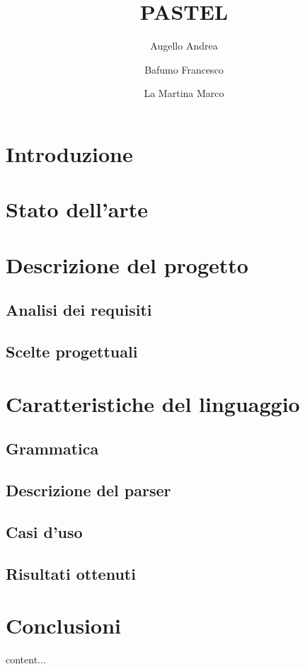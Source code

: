 \documentclass[]{article}
\title{PASTEL}
\author{{Augello Andrea} \and {Bafumo Francesco} \and{La Martina Marco}}
\begin{document}
\maketitle

\section{Introduzione}
\section{Stato dell'arte}
\section{Descrizione del progetto}
\subsection{Analisi dei requisiti}
\subsection{Scelte progettuali}
\section{Caratteristiche del linguaggio}
\subsection{Grammatica}
\subsection{Descrizione del parser}
\subsection{Casi d'uso}
\subsection{Risultati ottenuti}
\section{Conclusioni}

\begin{thebibliography}{widestlabel}
	content...
\end{thebibliography}
\end{document}
